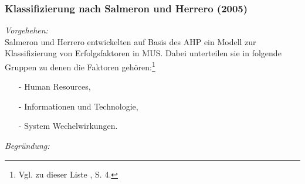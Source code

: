 \noindent
\subsubsection{Klassifizierung nach Salmeron und Herrero (2005)}
\textit{Vorgehehen:}\\\noindent
Salmeron und Herrero entwickelten auf Basis des \ac{AHP} ein Modell zur Klassifizierung von Erfolgsfaktoren in \ac{MUS}. Dabei unterteilen sie in
folgende Gruppen zu denen die Faktoren gehören:\footnote{Vgl. zu dieser Liste \cite{Salmeron.2005}, S. 4.}
\begin{itemize}\itemsep0pt
\item[-]Human Resources,
\item[-]Informationen und Technologie,
\item[-]System Wechelwirkungen.
\end{itemize}
\textit{Begründung:}\\\noindent